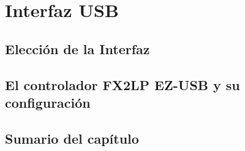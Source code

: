 \chapter{Interfaz USB}
	
	\label{cap:cy}
	\section{Elección de la Interfaz}
		
	\section{El controlador FX2LP EZ-USB y su configuración}
		
%		
		
	\section{Sumario del capítulo}
		
